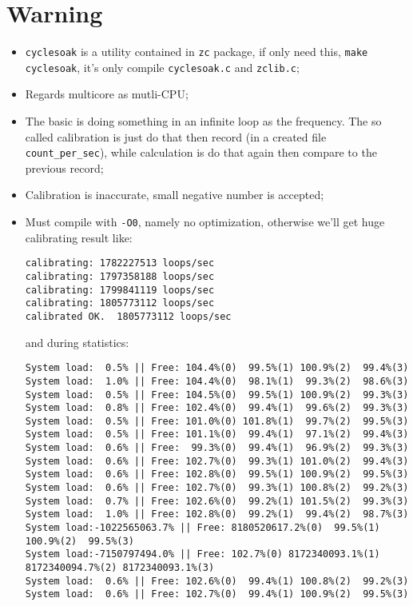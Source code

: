 \documentclass[a4paper]{report}
\begin{document}
\section{Warning}
\begin{itemize}
    \item {\tt cyclesoak} is a utility contained in {\tt zc} package, if only need this, 
          {\tt make cyclesoak}, it's only compile {\tt cyclesoak.c} and {\tt zclib.c};
    \item Regards multicore as mutli-CPU;
    \item The basic is doing something in an infinite loop as the frequency. The so called
          calibration is just do that then record (in a created file {\tt count\_per\_sec}), 
          while calculation is do that again then compare to the previous record;
    \item Calibration is inaccurate, small negative number is accepted;
    \item Must compile with {\tt -O0}, namely no optimization, otherwise we'll get
          huge calibrating result like:
\begin{lstlisting}
calibrating: 1782227513 loops/sec
calibrating: 1797358188 loops/sec
calibrating: 1799841119 loops/sec
calibrating: 1805773112 loops/sec
calibrated OK.  1805773112 loops/sec
\end{lstlisting}
          and during statistics:
\begin{lstlisting}
System load:  0.5% || Free: 104.4%(0)  99.5%(1) 100.9%(2)  99.4%(3)
System load:  1.0% || Free: 104.4%(0)  98.1%(1)  99.3%(2)  98.6%(3)
System load:  0.5% || Free: 104.5%(0)  99.5%(1) 100.9%(2)  99.3%(3)
System load:  0.8% || Free: 102.4%(0)  99.4%(1)  99.6%(2)  99.3%(3)
System load:  0.5% || Free: 101.0%(0) 101.8%(1)  99.7%(2)  99.5%(3)
System load:  0.5% || Free: 101.1%(0)  99.4%(1)  97.1%(2)  99.4%(3)
System load:  0.6% || Free:  99.3%(0)  99.4%(1)  96.9%(2)  99.3%(3)
System load:  0.6% || Free: 102.7%(0)  99.3%(1) 101.0%(2)  99.4%(3)
System load:  0.6% || Free: 102.8%(0)  99.5%(1) 100.9%(2)  99.5%(3)
System load:  0.6% || Free: 102.7%(0)  99.3%(1) 100.8%(2)  99.2%(3)
System load:  0.7% || Free: 102.6%(0)  99.2%(1) 101.5%(2)  99.3%(3)
System load:  1.0% || Free: 102.8%(0)  99.2%(1)  99.4%(2)  98.7%(3)
System load:-1022565063.7% || Free: 8180520617.2%(0)  99.5%(1) 100.9%(2)  99.5%(3)
System load:-7150797494.0% || Free: 102.7%(0) 8172340093.1%(1) 8172340094.7%(2) 8172340093.1%(3)
System load:  0.6% || Free: 102.6%(0)  99.4%(1) 100.8%(2)  99.2%(3)
System load:  0.6% || Free: 102.7%(0)  99.4%(1) 100.9%(2)  99.5%(3)

\end{lstlisting}
\end{itemize}
\end{document}
